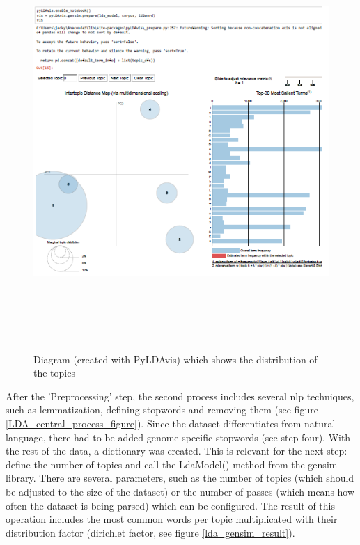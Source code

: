 \begin{figure}[htbp]
	\centering
	\includegraphics[width=1\textwidth, height=600px, keepaspectratio]{Image/pyldavis_digram.png}
	\caption{Diagram (created with PyLDAvis) which shows the distribution of the topics}
	\label{pyldavis_diagram}
\end{figure}

After the 'Preprocessing' step, the second process includes several \ac{nlp} techniques, such as lemmatization, defining stopwords and removing them (see figure \ref{LDA_central_process_figure}). Since the dataset differentiates from natural language, there had to be added genome-specific stopwords (see step four). With the rest of the data, a dictionary was created. This is relevant for the next step: define the number of topics and call the LdaModel() method from the gensim library. 
There are several parameters, such as the number of topics (which should be adjusted to the size of the dataset) or the number of passes (which means how often the dataset is being parsed) which can be configured.
The result of this operation includes the most common words per topic multiplicated with their distribution factor (dirichlet factor, see figure \ref{lda_gensim_result}). 

